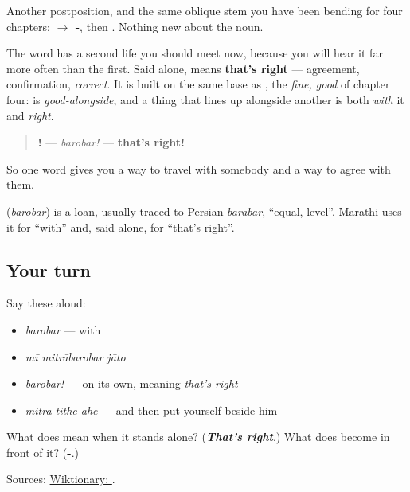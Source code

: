 Another postposition, and the same oblique stem you have been bending for four chapters: \textbf{ $\to$ -}, then \textbf{}. Nothing new about the noun.

The word has a second life you should meet now, because you will hear it far more often than the first. Said alone, \textbf{} means \textbf{that's right} — agreement, confirmation, \emph{correct}. It is built on the same base as \textbf{}, the \emph{fine, good} of chapter four: \textbf{} is \emph{good-alongside}, and a thing that lines up alongside another is both \emph{with} it and \emph{right}.

\begin{quote}
\textbf{!} — \emph{barobar!} — \textbf{that's right!}
\end{quote}

So one word gives you a way to travel with somebody and a way to agree with them.

\begin{cousinweb}
\textbf{} (\emph{barobar}) is a loan, usually traced to Persian \emph{barābar}, \textquotedblleft{}equal, level\textquotedblright{}. Marathi uses it for \textquotedblleft{}with\textquotedblright{} and, said alone, for \textquotedblleft{}that's right\textquotedblright{}.
\end{cousinweb}

\subsection*{Your turn}
Say these aloud:

\begin{itemize}
\raggedright
  \item \emph{barobar} — with
  \item \emph{mī mitrābarobar jāto}
  \item \emph{barobar!} — on its own, meaning \emph{that's right}
  \item \emph{mitra tithe āhe} — and then put yourself beside him
\end{itemize}

\begin{tcolorbox}[breakable,colback=teal!4,colframe=teal!35!black,title={Before you move on}]
What does \textbf{} mean when it stands alone? (\emph{\textbf{That's right}}.) What does \textbf{} become in front of it? (\textbf{-}.)

Sources: \href{https://en.wiktionary.org/wiki/\%E0\%A4\%AC\%E0\%A4\%B0\%E0\%A5\%8B\%E0\%A4\%AC\%E0\%A4\%B0}{Wiktionary: }.
\end{tcolorbox}

